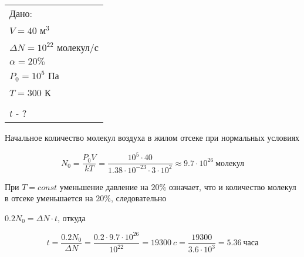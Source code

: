 \solutionSection

\begin{tabular}{l|}
    Дано: \\
    $V = 40$ м$^3$ \\
    $\Delta N = 10^{22}$ молекул/с \\
    $\alpha= 20\%$ \\
    $P_0 = 10^5$ Па \\
    $T = 300$ К \\
    \hline \\
    $t$ - ?
\end{tabular}

Начальное количество молекул воздуха в жилом отсеке при нормальных условиях

$$N_0 = \frac{P_0V}{kT} = \frac{10^5 \cdot 40}{1.38 \cdot 10^{-23} \cdot 3 \cdot 10^2} \approx 9.7 \cdot 10^{26} \: \text{молекул}$$

При $T=const$ уменьшение давление на $20\%$ означает, что и количество молекул в отсеке уменьшается на $20\%$, следовательно 
 
$0.2 N_0 = \Delta N \cdot t$, откуда

$$t = \frac{0.2 N_0}{\Delta N} = \frac{0.2 \cdot 9.7 \cdot 10^{26}}{10^{22}} = 19300 \: c = \frac{19300}{3.6 \cdot 10^3} = 5.36 \: \text{часа}$$


